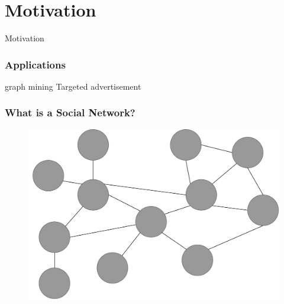\section{Motivation}

\begin{frame}
     \begin{center}
     	\huge Motivation
     \end{center}
\end{frame}

\begin{frame}
	\frametitle{Applications}
	graph mining
	Targeted advertisement 
\end{frame}

\begin{frame}
\frametitle{What is a Social Network?}
\begin{figure}
\includegraphics[scale=0.25]{graphics/social_network.pdf}
\end{figure}
\end{frame}
